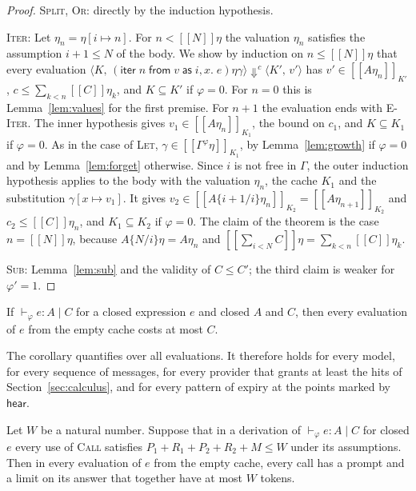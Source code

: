 \documentclass[acmsmall,nonacm,screen]{acmart}
\newcommand{\kw}[1]{\mathsf{#1}}
\newcommand{\iter}[4]{\kw{iter}\;#1\;\kw{from}\;#2\;\kw{as}\;#3.\;#4}
\newcommand{\ev}[5]{\langle #1,\, #2\rangle \Downarrow^{#3} \langle #4,\, #5\rangle}
\newcommand{\sem}[1]{[\![#1]\!]}
\begin{document}
\begin{proof}
\textsc{Split}, \textsc{Or}: directly by the induction hypothesis.

\textsc{Iter}: Let $\eta_n = \eta[i \mapsto n]$. For $n < \sem{N}\eta$ the valuation
$\eta_n$ satisfies the assumption $i + 1 \le N$ of the body. We show by induction on
$n \le \sem{N}\eta$ that every evaluation $\ev{K}{(\iter{n}{v}{i,x}{e})\eta\gamma}{c}{K'}{v'}$ has
$v' \in \sem{A\eta_n}_{K'}$, $c \le \sum_{k<n} \sem{C}\eta_k$, and $K \subseteq K'$ if
$\varphi = 0$. For $n = 0$ this is Lemma~\ref{lem:values} for the first premise. For $n + 1$
the evaluation ends with \textsc{E-Iter}. The inner hypothesis gives
$v_1 \in \sem{A\eta_n}_{K_1}$, the bound on $c_1$, and $K \subseteq K_1$ if $\varphi = 0$. As
in the case of \textsc{Let}, $\gamma \in \sem{\Gamma^\varphi\eta}_{K_1}$, by
Lemma~\ref{lem:growth} if $\varphi = 0$ and by Lemma~\ref{lem:forget} otherwise. Since $i$ is
not free in $\Gamma$, the outer induction hypothesis applies to the body with the valuation
$\eta_n$, the cache $K_1$ and the substitution $\gamma[x \mapsto v_1]$. It gives
$v_2 \in \sem{A\{i+1/i\}\eta_n}_{K_2} = \sem{A\eta_{n+1}}_{K_2}$ and
$c_2 \le \sem{C}\eta_n$, and $K_1 \subseteq K_2$ if $\varphi = 0$. The claim of the theorem
is the case $n = \sem{N}\eta$, because $A\{N/i\}\eta = A\eta_n$ and
$\sem{\sum_{i<N} C}\eta = \sum_{k<n} \sem{C}\eta_k$.

\textsc{Sub}: Lemma~\ref{lem:sub} and the validity of $C \le C'$; the third claim is weaker
for $\varphi' = 1$.
\end{proof}

\begin{corollary}
\label{cor:closed}
If $\vdash_\varphi e : A \mid C$ for a closed expression $e$ and closed $A$ and $C$, then
every evaluation of $e$ from the empty cache costs at most $C$.
\end{corollary}

The corollary quantifies over all evaluations. It therefore holds for every model, for every
sequence of messages, for every provider that grants at least the hits of
Section~\ref{sec:calculus}, and for every pattern of expiry at the points marked by
$\kw{hear}$.

\begin{corollary}
\label{cor:window}
Let $W$ be a natural number. Suppose that in a derivation of $\vdash_\varphi e : A \mid C$
for closed $e$ every use of \textsc{Call} satisfies $P_1 + R_1 + P_2 + R_2 + M \le W$ under
its assumptions. Then in every
evaluation of $e$ from the empty cache, every call has a prompt and a limit on its answer that
together have at most $W$ tokens.
\end{corollary}
\end{document}

